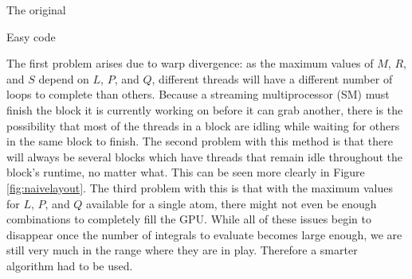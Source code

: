 \begin{algorithm}
\caption{The original }
\label{origcode}
\begin{algorithmic}
				\ELSE
				\ENDIF
					\ELSE
					\ENDIF
					\ENDFOR
				\ENDFOR
			\ENDFOR
		\ENDFOR
	\ENDFOR
\ENDFOR
\end{algorithmic}
\end{algorithm}

\begin{algorithm}
\caption{Easy code}
\label{easycode}
\begin{algorithmic}

\STATE{}
				\ELSE
				\ENDIF
					\ELSE
					\ENDIF
					\ENDFOR
				\ENDFOR
			\ENDFOR
\ENDIF
\end{algorithmic}
\end{algorithm}

The first problem arises due to warp divergence: as the maximum values of $M$, $R$, and $S$ depend on $L$, $P$, and $Q$, different threads will have a different number of loops to complete than others. Because a streaming multiprocessor (SM) must finish the block it is currently working on before it can grab another, there is the possibility that most of the threads in a block are idling while waiting for others in the same block to finish. The second problem with this method is that there will always be several blocks which have threads that remain idle throughout the block's runtime, no matter what. This can be seen more clearly in Figure \ref{fig:naivelayout}. The third problem with this is that with the maximum values for $L$, $P$, and $Q$ available for a single atom, there might not even be enough combinations to completely fill the GPU. While all of these issues begin to disappear once the number of integrals to evaluate becomes large enough, we are still very much in the range where they are in play. Therefore a smarter algorithm had to be used.

